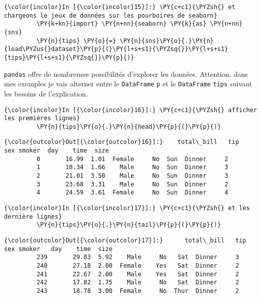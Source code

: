     \begin{Verbatim}[commandchars=\\\{\}]
{\color{incolor}In [{\color{incolor}15}]:} \PY{c+c1}{\PYZsh{} et chargeons le jeux de données sur les pourboires de seaborn}
         \PY{k+kn}{import} \PY{n+nn}{seaborn} \PY{k}{as} \PY{n+nn}{sns}
         \PY{n}{tips} \PY{o}{=} \PY{n}{sns}\PY{o}{.}\PY{n}{load\PYZus{}dataset}\PY{p}{(}\PY{l+s+s1}{\PYZsq{}}\PY{l+s+s1}{tips}\PY{l+s+s1}{\PYZsq{}}\PY{p}{)}
\end{Verbatim}


    \texttt{pandas} offre de nombreuses possibilités d'explorer les données.
Attention, dans mes exemples je vais alterner entre le
\texttt{DataFrame} \texttt{p} et le \texttt{DataFrame} \texttt{tips}
suivant les besoins de l'explication.

    \begin{Verbatim}[commandchars=\\\{\}]
{\color{incolor}In [{\color{incolor}16}]:} \PY{c+c1}{\PYZsh{} afficher les premières lignes}
         \PY{n}{tips}\PY{o}{.}\PY{n}{head}\PY{p}{(}\PY{p}{)}
\end{Verbatim}


\begin{Verbatim}[commandchars=\\\{\}]
{\color{outcolor}Out[{\color{outcolor}16}]:}    total\_bill   tip     sex smoker  day    time  size
         0       16.99  1.01  Female     No  Sun  Dinner     2
         1       10.34  1.66    Male     No  Sun  Dinner     3
         2       21.01  3.50    Male     No  Sun  Dinner     3
         3       23.68  3.31    Male     No  Sun  Dinner     2
         4       24.59  3.61  Female     No  Sun  Dinner     4
\end{Verbatim}
            
    \begin{Verbatim}[commandchars=\\\{\}]
{\color{incolor}In [{\color{incolor}17}]:} \PY{c+c1}{\PYZsh{} et les dernière lignes}
         \PY{n}{tips}\PY{o}{.}\PY{n}{tail}\PY{p}{(}\PY{p}{)}
\end{Verbatim}


\begin{Verbatim}[commandchars=\\\{\}]
{\color{outcolor}Out[{\color{outcolor}17}]:}      total\_bill   tip     sex smoker   day    time  size
         239       29.03  5.92    Male     No   Sat  Dinner     3
         240       27.18  2.00  Female    Yes   Sat  Dinner     2
         241       22.67  2.00    Male    Yes   Sat  Dinner     2
         242       17.82  1.75    Male     No   Sat  Dinner     2
         243       18.78  3.00  Female     No  Thur  Dinner     2
\end{Verbatim}
            
